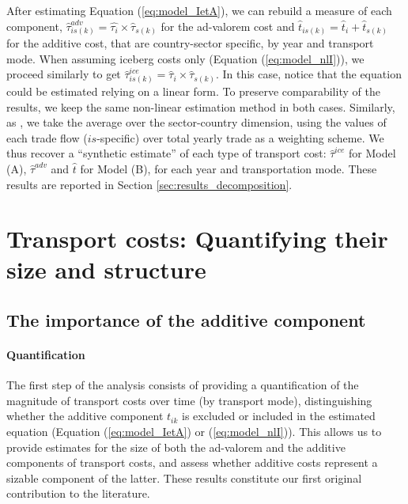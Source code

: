 \documentclass[a4paper,11pt]{article}
\begin{document}
After estimating Equation (\ref{eq:model_IetA}), we can rebuild a measure of each component, $\widehat{\tau}^{adv}_{is(k)} = \widehat{\tau_{i}} \times \widehat{\tau}_{s(k)}$ for the ad-valorem cost and $\widehat{t}_{is(k)} = \widehat{t}_{i} + \widehat{t}_{s(k)}$ for the additive cost, that are country-sector specific, by year and transport mode.
When assuming iceberg costs only (Equation (\ref{eq:model_nlI})), we proceed similarly to get $\widehat{\tau}^{ice}_{is(k)} = \widehat{\tau}_{i} \times \widehat{\tau}_{s(k)}$.
In this case, notice that the equation could be estimated relying on a linear form.
To preserve comparability of the results, we keep the same non-linear estimation method in both cases.
Similarly, as \cite{Irrazabal_2015}, we take the average over the sector-country dimension, using the values of each trade flow ($is$-specific) over total yearly trade as a weighting scheme.
We thus recover a ``synthetic estimate'' of each type of transport cost: $\widehat{\tau}^{ice}$ for Model (A), $\widehat{\tau}^{adv}$ and $\widehat{t}$ for Model (B), for each year and transportation mode.
These results are reported in Section \ref{sec:results_decomposition}.


\section{Transport costs: Quantifying their size and structure}\label{sec:basic_results}

\subsection{The importance of the additive component \label{sec:results_decomposition}}

\paragraph{Quantification} The first step of the analysis consists of providing a quantification of the magnitude of transport costs over time (by transport mode), distinguishing whether the additive component $t_{ik}$ is excluded or included in the estimated equation (Equation (\ref{eq:model_IetA}) or (\ref{eq:model_nlI})).
This allows us to provide estimates for the size of both the ad-valorem and the additive components of transport costs, and assess whether additive costs represent a sizable component of the latter.
These results constitute our first original contribution to the literature.
\smallskip
\end{document}
